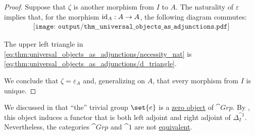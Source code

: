 \begin{proof}
  Suppose that \( \zeta \) is another morphism from \( I \) to \( A \). The naturality of \( \varepsilon \) implies that, for the morphism \( \operatorname{id}_A: A \to A \), the following diagram commutes:
  \begin{equation}\label{eq:thm:universal_objects_as_adjunctions/necessity_nat}
    \begin{aligned}
      \texttt{[image: output/thm\_\_universal\_objects\_as\_adjunctions.pdf]}
    \end{aligned}
  \end{equation}

  The upper left triangle in \eqref{eq:thm:universal_objects_as_adjunctions/necessity_nat} is \eqref{eq:thm:universal_objects_as_adjunctions/d_triangle}.

  We conclude that \( \zeta = \varepsilon_A \) and, generalizing on \( A \), that every morphism from \( I \) is unique.
\end{proof}

\begin{remark}\label{rem:left_and_right_adjoint_not_equivalence}
  We discussed in  that \enquote{the} trivial group \( \set{ e } \) is a \hyperref[def:universal_objects/zero]{zero object} of \( \cat{Grp} \). By , this object induces a functor that is both left adjoint and right adjoint of \( \Delta_I^{\cat{1}} \). Nevertheless, the categories \( \cat{Grp} \) and \( \cat{1} \) are not \hyperref[def:equivalence_of_categories]{equivalent}.
\end{remark}

